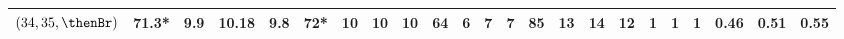 \begin{table*}[t!]
\begin{tabular}{l|rrrr|rrrr|rrrr|rrrr|rrrrrr}
    $(34,35,\thenBr)$    & 71.3*    & 9.9   & 10.18 & 9.8   & 72*   & 10 & 10    & 10   & 64  & 6   & 7  & 7   & 85  & 13  & 14  & 12  & 1 & 1 & 1 & 0.46 & 0.51 & 0.55 \\
    \bottomrule
    \end{tabular}
\end{table*}

